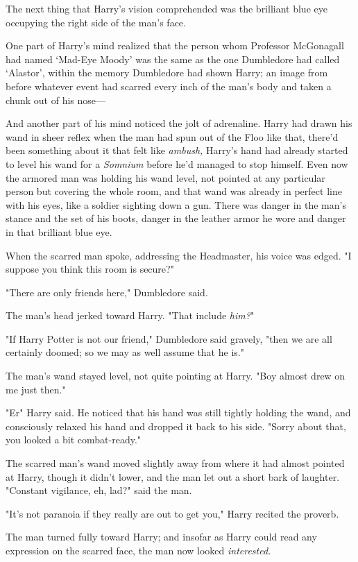 The next thing that Harry's vision comprehended was the brilliant blue eye
occupying the right side of the man's face.

One part of Harry's mind realized that the person whom Professor McGonagall had
named `Mad-Eye Moody' was the same as the one Dumbledore had called `Alastor',
within the memory Dumbledore had shown Harry; an image from before whatever
event had scarred every inch of the man's body and taken a chunk out of his
nose---

And another part of his mind noticed the jolt of adrenaline. Harry had drawn
his wand in sheer reflex when the man had spun out of the Floo like that,
there'd been something about it that felt like \emph{ambush,} Harry's hand had
already started to level his wand for a \emph{Somnium} before he'd managed to
stop himself. Even now the armored man was holding his wand level, not pointed
at any particular person but covering the whole room, and that wand was already
in perfect line with his eyes, like a soldier sighting down a gun. There was
danger in the man's stance and the set of his boots, danger in the leather
armor he wore and danger in that brilliant blue eye.

When the scarred man spoke, addressing the Headmaster, his voice was edged. "I
suppose you think this room is secure?"

"There are only friends here," Dumbledore said.

The man's head jerked toward Harry. "That include \emph{him?}"

"If Harry Potter is not our friend," Dumbledore said gravely, "then we are all
certainly doomed; so we may as well assume that he is."

The man's wand stayed level, not quite pointing at Harry. "Boy almost drew on
me just then."

"Er{\el}" Harry said. He noticed that his hand was still tightly holding the
wand, and consciously relaxed his hand and dropped it back to his side. "Sorry
about that, you looked a bit{\el} combat-ready."

The scarred man's wand moved slightly away from where it had almost pointed at
Harry, though it didn't lower, and the man let out a short bark of laughter.
"Constant vigilance, eh, lad?" said the man.

"It's not paranoia if they really are out to get you," Harry recited the
proverb.

The man turned fully toward Harry; and insofar as Harry could read any
expression on the scarred face, the man now looked \emph{interested}.

